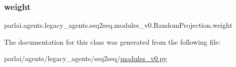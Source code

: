 \subsubsection{\texorpdfstring{weight}{weight}}
{\footnotesize\ttfamily parlai.\+agents.\+legacy\+\_\+agents.\+seq2seq.\+modules\+\_\+v0.\+Random\+Projection.\+weight}



The documentation for this class was generated from the following file\+:\begin{DoxyCompactItemize}
\item 
parlai/agents/legacy\+\_\+agents/seq2seq/\hyperlink{seq2seq_2modules__v0_8py}{modules\+\_\+v0.\+py}\end{DoxyCompactItemize}
